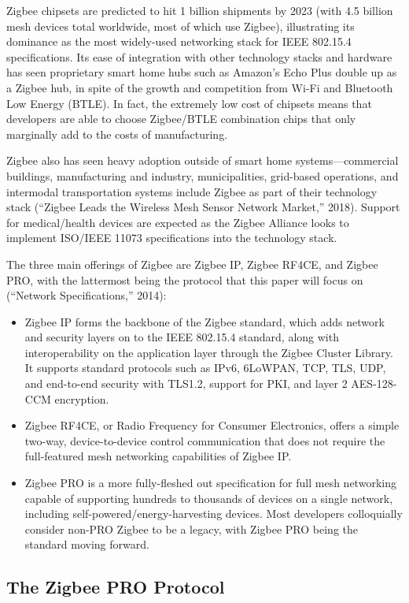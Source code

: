 Zigbee chipsets are predicted to hit 1 billion shipments by 2023 (with 4.5 billion mesh devices total worldwide, most of which use Zigbee), illustrating its dominance as the most widely-used networking stack for IEEE 802.15.4 specifications. Its ease of integration with other technology stacks and hardware has seen proprietary smart home hubs such as Amazon’s Echo Plus double up as a Zigbee hub, in spite of the growth and competition from Wi-Fi and Bluetooth Low Energy (BTLE). In fact, the extremely low cost of chipsets means that developers are able to choose Zigbee/BTLE combination chips that only marginally add to the costs of manufacturing. 

Zigbee also has seen heavy adoption outside of smart home systems---commercial buildings, manufacturing and industry, municipalities, grid-based operations, and intermodal transportation systems include Zigbee as part of their technology stack (“Zigbee Leads the Wireless Mesh Sensor Network Market,” 2018). Support for medical/health devices are expected as the Zigbee Alliance looks to implement ISO/IEEE 11073 specifications into the technology stack.

The three main offerings of Zigbee are Zigbee IP, Zigbee RF4CE, and Zigbee PRO, with the lattermost being the protocol that this paper will focus on (“Network Specifications,” 2014):
\begin{itemize}
\item Zigbee IP forms the backbone of the Zigbee standard, which adds network and security layers on to the IEEE 802.15.4 standard, along with interoperability on the application layer through the Zigbee Cluster Library. It supports standard protocols such as IPv6, 6LoWPAN, TCP, TLS, UDP, and end-to-end security with TLS1.2, support for PKI, and layer 2 AES-128-CCM encryption. 
\item Zigbee RF4CE, or Radio Frequency for Consumer Electronics, offers a simple two-way, device-to-device control communication that does not require the full-featured mesh networking capabilities of Zigbee IP. 
\item Zigbee PRO is a more fully-fleshed out specification for full mesh networking capable of supporting hundreds to thousands of devices on a single network, including self-powered/energy-harvesting devices. Most developers colloquially consider non-PRO Zigbee to be a legacy, with Zigbee PRO being the standard moving forward.
\end{itemize}

\subsection{The Zigbee PRO Protocol}

